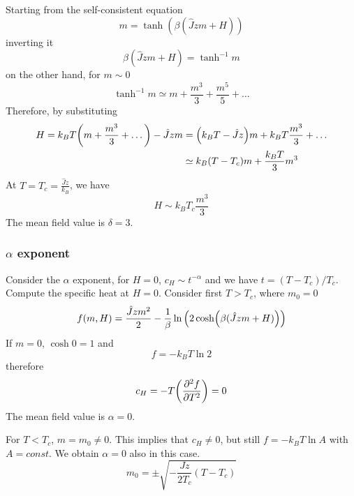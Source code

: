 \documentclass[../main/main.tex]{subfiles}
\begin{document}
Starting from the self-consistent equation
\begin{equation}
  m = \tanh (\beta (\hat{J}zm+H ))
  \label{eq:12_1}
\end{equation}
inverting it
\begin{equation}
  \beta (\hat{J}zm+H ) = \tanh^{-1} m
\end{equation}
on the other hand, for \( m \sim 0 \)
\begin{equation}
  \tanh^{-1} m \simeq m + \frac{m^3}{3} + \frac{m^5}{5} + \dots
\end{equation}
Therefore, by substituting
\begin{equation}
\begin{split}
  H  = k_B T \qty(m+ \frac{m^3}{3} + \dots) - \hat{J} z m
    &= \qty(k_B T - \hat{J}z) m + k_B T \frac{m^3}{3} + \dots \\
    & \simeq k_B (T-T_c)m + \frac{k_B T}{3}m^3
\end{split}
\end{equation}
At \( T=T_c= \frac{\hat{J}z }{k_B} \), we have
\begin{equation}
  H \sim k_B T_c \frac{m^3}{3}
\end{equation}
The mean field value is \( \delta =3 \).
\subsubsection{\( \alpha  \) exponent}
Consider the \( \alpha  \) exponent, for  \( H=0 \), \( c_H \sim t^{-\alpha } \) and we have \( t = (T-T_c)/T_c \).
Compute the specific heat at \( H=0 \).
Consider first \( T>T_c \), where \( m_0 =0 \)
\begin{equation}
  f(m,H) = \frac{\hat{J}zm^2 }{2} - \frac{1}{\beta } \ln{\qty(2\cosh(\beta (\hat{J}zm+H ))) }
\end{equation}
If \( m=0 \), \( \cosh 0 =1 \) and
\begin{equation}
  f = -k_B T \ln{2}
\end{equation}
therefore
\begin{equation}
  c_H = - T \qty(\pdv[2]{f}{T} ) = 0
\end{equation}
The mean field value is \( \alpha =0 \).
\begin{remark}
For \( T<T_c \), \( m=m_0 \neq 0 \). This implies that \( c_H \neq 0 \), but still \( f=-k_BT \ln{A}  \) with \( A= const \). We obtain \( \alpha =0 \) also in this case.
\begin{equation}
  m_0 = \pm \sqrt{- \frac{Jz}{2T_c}(T-T_c)}
\end{equation}
\end{remark}
\end{document}
